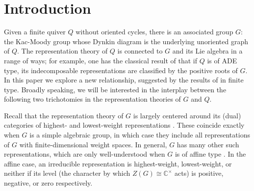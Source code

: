 \documentclass[12pt]{amsart}
\newcommand{\sayDR}[1]{\say[DR]{\color{red}{\bf DR:}\;#1}}
\newcommand{\CC}{\mathbb{C}}
\theoremstyle{remark}
\numberwithin{equation}{section}
\numberwithin{figure}{section}
\begin{document}

\section{Introduction}

Given a finite quiver $Q$ without oriented cycles, there is an associated group $G$: the Kac-Moody group whose Dynkin diagram is the underlying unoriented graph of $Q$.
The representation theory of $Q$ is connected to $G$ and its Lie algebra in a range of ways; for example, one has the classical result of \cite{BGP73} that if $Q$ is of ADE type, its indecomposable representations are classified by the positive roots of $G$.
In this paper we explore a new relationship, suggested by the results of \cite{YZ08} in finite type.
Broadly speaking, we will be interested in the interplay between the following two trichotomies in the representation theories of $G$ and $Q$.

Recall that the representation theory of $G$ is largely centered around its (dual) categories of highest- and lowest-weight representations \cite{KP83,Kum02}.
These coincide exactly when $G$ is a simple algebraic group, in which case they include all representations of $G$ with finite-dimensional weight spaces.
In general, $G$ has many other such representations, which are only well-understood when $G$ is of affine type \cite{Cha86}.
In the affine case, an irreducible representation is highest-weight, lowest-weight, or neither if its level (the character by which $Z(G) \cong \CC^\times$ acts) is positive, negative, or zero respectively.
\end{document}
